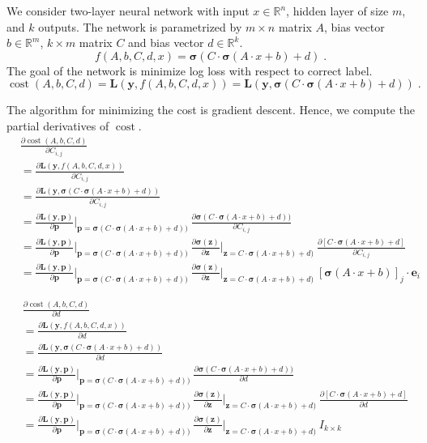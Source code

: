 \documentclass[12pt]{article}
\DeclareMathOperator{\cost}{cost}
\newcommand{\R}{\mathbb{R}}
\newcommand{\bsigma}{\pmb{\sigma}}
\newcommand{\y}{\mathbf{y}}
\newcommand{\p}{\mathbf{p}}
\newcommand{\z}{\mathbf{z}}
\newcommand{\e}{\mathbf{e}}
\renewcommand{\L}{\mathbf{L}}
\begin{document}
We consider two-layer neural network with input $x \in \R^n$, hidden layer of size $m$, and $k$ outputs.
The network is parametrized by $m \times n$ matrix $A$, bias vector $b \in \R^m$, $k \times m$ matrix $C$ and bias vector $d \in \R^k$.
$$
f(A,b,C,d,x) = \bsigma(C \cdot \bsigma(A \cdot x + b) + d) \; .
$$
The goal of the network is minimize log loss with respect to correct label.
$$
\cost(A,b,C,d) = \L(\y, f(A,b,C,d,x)) = \L(\y, \bsigma(C \cdot \bsigma(A \cdot x + b) + d)) \; .
$$

The algorithm for minimizing the cost is gradient descent. Hence, we
compute the partial derivatives of $\cost$.
\begin{align*}
& \frac{\partial \cost(A,b,C,d)}{\partial C_{i,j}} \\
& = \frac{\partial \L(\y, f(A,b,C,d,x))}{\partial C_{i,j}}  \\
& = \frac{\partial \L(\y, \bsigma(C \cdot \bsigma(A \cdot x + b) + d))}{\partial C_{i,j}} \\
& = \frac{\partial \L(\y, \p)}{\partial \p}\bigg|_{\p=\bsigma(C \cdot \bsigma(A \cdot x + b) + d))} \ \frac{\partial \bsigma(C \cdot \bsigma(A \cdot x + b) + d))}{\partial C_{i,j}} \\
& = \frac{\partial \L(\y, \p)}{\partial \p}\bigg|_{\p=\bsigma(C \cdot \bsigma(A \cdot x + b) + d))} \ \frac{\partial \bsigma(\z)}{\partial \z}\bigg|_{\z=C \cdot \bsigma(A \cdot x + b) + d)}
\ \frac{\partial [C \cdot \bsigma(A \cdot x + b) + d]}{\partial C_{i,j}} \\
& = \frac{\partial \L(\y, \p)}{\partial \p}\bigg|_{\p=\bsigma(C \cdot \bsigma(A \cdot x + b) + d))} \ \frac{\partial \bsigma(\z)}{\partial \z}\bigg|_{\z=C \cdot \bsigma(A \cdot x + b) + d)}
\ [\bsigma(A \cdot x + b)]_j \cdot \e_i
\end{align*}

\begin{align*}
& \frac{\partial \cost(A,b,C,d)}{\partial d} \\
& = \frac{\partial \L(\y, f(A,b,C,d,x))}{\partial d}  \\
& = \frac{\partial \L(\y, \bsigma(C \cdot \bsigma(A \cdot x + b) + d))}{\partial d} \\
& = \frac{\partial \L(\y, \p)}{\partial \p}\bigg|_{\p=\bsigma(C \cdot \bsigma(A \cdot x + b) + d))} \ \frac{\partial \bsigma(C \cdot \bsigma(A \cdot x + b) + d))}{\partial d} \\
& = \frac{\partial \L(\y, \p)}{\partial \p}\bigg|_{\p=\bsigma(C \cdot \bsigma(A \cdot x + b) + d))} \ \frac{\partial \bsigma(\z)}{\partial \z}\bigg|_{\z=C \cdot \bsigma(A \cdot x + b) + d)}
\ \frac{\partial [C \cdot \bsigma(A \cdot x + b) + d]}{\partial d} \\
& = \frac{\partial \L(\y, \p)}{\partial \p}\bigg|_{\p=\bsigma(C \cdot \bsigma(A \cdot x + b) + d))} \ \frac{\partial \bsigma(\z)}{\partial \z}\bigg|_{\z=C \cdot \bsigma(A \cdot x + b) + d)}
\ I_{k \times k}
\end{align*}
\end{document}
